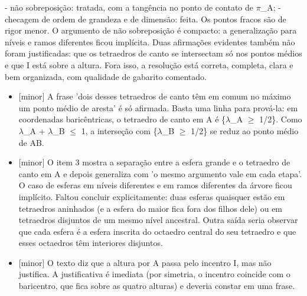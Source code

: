 \documentclass{article}%
\begin{document}
{-} não sobreposição: tratada, com a tangência no ponto de contato de $\pi$\_A;\newline%
{-} checagem de ordem de grandeza e de dimensão: feita.\newline%
\newline%
Os pontos fracos são de rigor menor. O argumento de não sobreposição é compacto: a generalização para níveis e ramos diferentes ficou implícita. Duas afirmações evidentes também não foram justificadas: que os tetraedros de canto se intersectam só nos pontos médios e que I está sobre a altura. Fora isso, a resolução está correta, completa, clara e bem organizada, com qualidade de gabarito comentado.%
\begin{itemize}%
\item%
{[}minor{]} A frase 'dois desses tetraedros de canto têm em comum no máximo um ponto médio de aresta' é só afirmada. Basta uma linha para prová{-}la: em coordenadas baricêntricas, o tetraedro de canto em A é \{$\lambda$\_A $\geq$ 1/2\}. Como $\lambda$\_A + $\lambda$\_B $\leq$ 1, a interseção com \{$\lambda$\_B $\geq$ 1/2\} se reduz ao ponto médio de AB.%
\item%
{[}minor{]} O item 3 mostra a separação entre a esfera grande e o tetraedro de canto em A e depois generaliza com 'o mesmo argumento vale em cada etapa'. O caso de esferas em níveis diferentes e em ramos diferentes da árvore ficou implícito. Faltou concluir explicitamente: duas esferas quaisquer estão em tetraedros aninhados (e a esfera do maior fica fora dos filhos dele) ou em tetraedros disjuntos de um mesmo nível ancestral. Outra saída seria observar que cada esfera é a esfera inscrita do octaedro central do seu tetraedro e que esses octaedros têm interiores disjuntos.%
\item%
{[}minor{]} O texto diz que a altura por A passa pelo incentro I, mas não justifica. A justificativa é imediata (por simetria, o incentro coincide com o baricentro, que fica sobre as quatro alturas) e deveria constar em uma frase.%
\end{itemize}%
\end{document}
